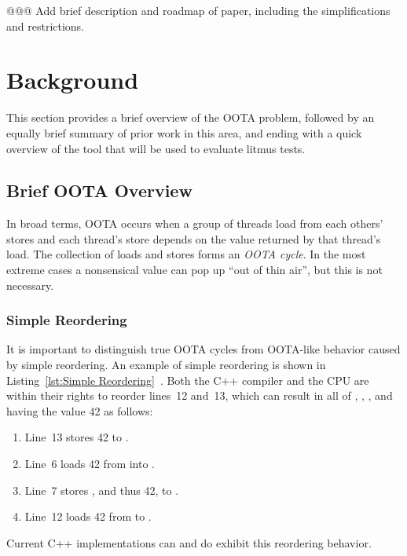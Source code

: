 \documentclass[10]{article}
\begin{document}
@@@ Add brief description and roadmap of paper, including the simplifications
and restrictions.

\section{Background}
\label{sec:Background}

This section provides a brief overview of the OOTA problem, followed
by an equally brief summary of prior work in this area, and ending
with a quick overview of the  tool that will be used to
evaluate litmus tests.

\subsection{Brief OOTA Overview}
\label{sec:Brief OOTA Overview}

In broad terms,
OOTA occurs when a group of threads load from each others' stores
and each thread's store depends on the value returned by that thread's load.
The collection of loads and stores forms an \emph{OOTA cycle}.
In the most extreme cases a nonsensical value can pop up ``out of thin air'',
but this is not necessary.

\subsubsection{Simple Reordering}
\label{sec:Simple Reordering}

It is important to distinguish true OOTA cycles from OOTA-like
behavior caused by simple reordering.
An example of simple reordering is shown in
Listing~\ref{lst:Simple Reordering}~\cite{PaulEMcKenney2020RelaxedGuideRelaxed}.
Both the C++ compiler and the CPU are within their rights to reorder
lines~12 and~13, which can result in all of , , ,
and  having the value 42 as follows:

\begin{enumerate}
\item   Line~13 stores 42 to .
\item   Line~6 loads 42 from  into .
\item   Line~7 stores , and thus 42, to .
\item   Line~12 loads 42 from  to .
\end{enumerate}

\noindent
Current C++ implementations can and do exhibit this reordering behavior.
\end{document}
